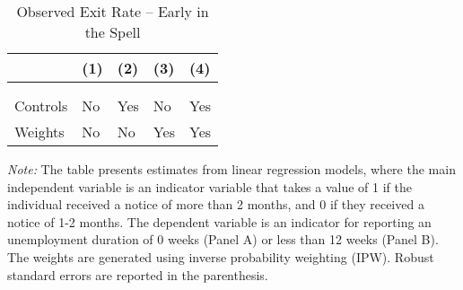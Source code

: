 \documentclass{div}
\begin{document}
\begin{table}[t]
\begin{threeparttable}
\caption{Observed Exit Rate -- Early in the Spell}\label{tab_init_hazard}
\begin{tabularx}{\textwidth}{p{}YYYY}
\toprule
& (1) & (2) & (3) & (4) \\
\midrule \addlinespace[1ex]
  \\ \addlinespace[2ex]
 \addlinespace[3ex]
  \\ \addlinespace[2ex]
 \addlinespace[2ex]
Controls   &  No & Yes  & No & Yes \\
Weights   & No  & No   & Yes & Yes \\
\midrule

\bottomrule
\end{tabularx}
\begin{tablenotes}
\item \textit{Note:} The table presents estimates from linear regression models, where the main independent variable is an indicator variable that takes a value of 1 if the individual received a notice of more than 2 months, and 0 if they received a notice of 1-2 months. The dependent variable is an indicator for reporting an unemployment duration of 0 weeks (Panel A) or less than 12 weeks (Panel B). The weights are generated using inverse probability weighting (IPW). Robust standard errors are reported in the parenthesis. 
\end{tablenotes}
\end{threeparttable}
\end{table}


\end{document}
